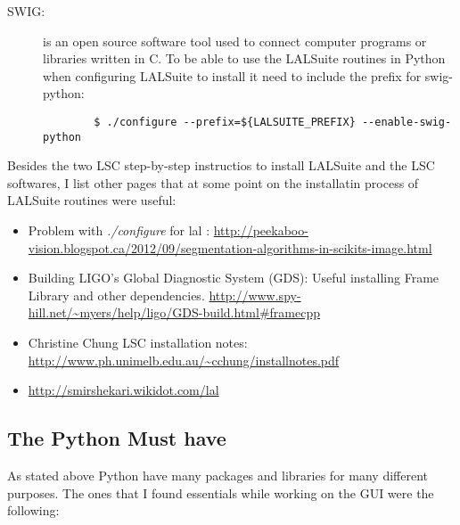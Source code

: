 \documentclass[11pt,fleqn]{book} %
\begin{document}
\begin{description}
\begin{description}
\begin{description}
	\item[SWIG:] is an open source software tool used to connect computer programs or libraries written in C. To be able to use the LALSuite routines in Python when configuring LALSuite to install it need to include the prefix for swig-python:\\ 
        	\begin{verbatim}
		$ ./configure --prefix=${LALSUITE_PREFIX} --enable-swig-python
            \end{verbatim}
	\end{description}

        \end{description}
	\end{description}


\begin{remark}
	Besides the two LSC step-by-step instructios to install LALSuite and the LSC softwares, I list other pages that at some point on the installatin process of LALSuite routines were useful:
	\begin{itemize}	
	\item Problem with \emph{./configure} for lal : \url{http://peekaboo-vision.blogspot.ca/2012/09/segmentation-algorithms-in-scikits-image.html}
	\item Building LIGO's Global Diagnostic System (GDS): Useful installing Frame Library and other dependencies. \url{http://www.spy-hill.net/~myers/help/ligo/GDS-build.html#framecpp}

	\item Christine Chung LSC installation notes: \url{http://www.ph.unimelb.edu.au/~cchung/installnotes.pdf}
	\item \url{http://smirshekari.wikidot.com/lal}
    \end{itemize}
\end{remark}


\subsection{The Python Must have}


As stated above Python have many packages and libraries for many different purposes. The ones that I found essentials while working on the GUI were the following:
\end{document}
